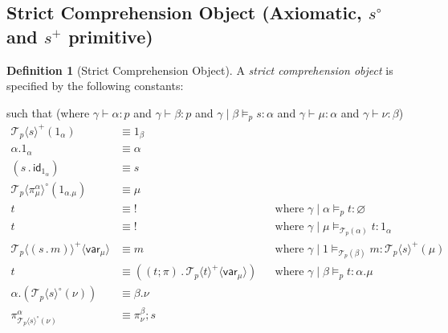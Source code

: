 \documentclass[10pt]{article}
\theoremstyle{definition}
\newtheorem{definition}{Definition}
\let\emptyset\varnothing
\newcommand{\yields}{\vdash}
\newcommand{\type}{\,\,\mathsf{mode}}
\newcommand\TermTwoT[5]{\ensuremath{#1 \mid #3 \vDash_{#5} #2 : #4}}
\newcommand{\id}{\mathsf{id}}
\newcommand\El[2]{\mathcal{T}_{#1}(#2)}
\newcommand\ApEl[2]{\mathcal{T}_{#1}\langle#2\rangle}
\newcommand\ap[2]{\ensuremath{#1 \langle #2 \rangle }}
\newcommand\bdot[0]{\mathbin{.}}
\newcommand\bang[0]{\mathord{!}}
\begin{document}
\subsection{Strict Comprehension Object (Axiomatic, $s^\circ$ and $s^+$ primitive)}

\begin{definition}[Strict Comprehension Object]
  A \emph{strict comprehension object} is specified by the following
  constants:
such that (where $\gamma \yields \alpha : p$ and $\gamma \yields \beta : p$ and  $\TermTwoT{\gamma}{s}{\beta}{\alpha}{p}$ and $\gamma
\yields \mu : \alpha$ and $\gamma \yields \nu : \beta$)
\begin{align}
\label{s-plus-one-strict}
\ApEl{p}{s}^+(1_\alpha) &\equiv 1_\beta && \\
\label{dot-one-strict}
\alpha.1_\alpha &\equiv \alpha \\
\label{pair-s-bang}
(s \bdot \id_{1_\alpha}) &\equiv s  && \\
\label{circ-one}
\ApEl{p}{\pi^\alpha_\mu}^\circ(1_{\alpha.\mu}) &\equiv \mu && \\
\label{bang-unique-p}
 t & \equiv \bang && \text{where } \TermTwoT{\gamma}{t}{\alpha}{\emptyset}{p}\\
\label{bang-unique}
 t & \equiv \bang && \text{where } \TermTwoT{\gamma}{t}{\mu}{1_\alpha}{\El{p}{\alpha}}\\
\label{beta-var}
\ap{\ApEl{p}{(s \bdot m)}^+}{\mathsf{var}_\mu} &\equiv m && \text{where } \TermTwoT{\gamma}{m}{1}{\ApEl{p}{s}^+(\mu)}{\El{p}{\beta}} \\
\label{eta-pi-var}
t &\equiv ((t;\pi) \bdot \ap{\ApEl{p}{t}^+}{\mathsf{var}_\mu}) && \text{where } \TermTwoT{\gamma}{t}{\beta}{\alpha.\mu}{p} \\
\label{dot-circ}
\alpha. (\ApEl{p}{s}^\circ(\nu)) &\equiv \beta.\nu && \\
\label{pi-dot-circ}
\pi^\alpha_{\ApEl{p}{s}^\circ(\nu)} &\equiv \pi^\beta_\nu;s && 

\end{align}
\end{definition}
\end{document}
